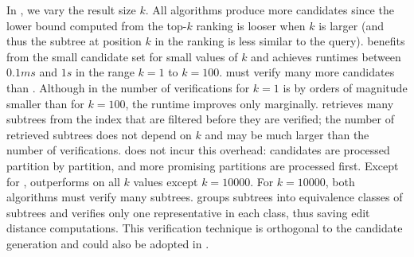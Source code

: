 In , we vary the result size $k$. All algorithms produce more candidates since the lower bound computed from the top-$k$ ranking is looser when $k$ is larger (and thus the subtree at position $k$ in the ranking is less similar to the query).
%
\shinconeshort{} benefits from the small candidate set for small values of $k$ and achieves runtimes between $0.1ms$ and $1s$ in the range $k = 1$ to $k = 100$. \structuresearchshort{} must verify many more candidates than \shincone{}. Although in \structuresearchshort{} the number of verifications for $k = 1$ is by orders of magnitude smaller than for $k = 100$, the runtime improves only marginally. \structuresearchshort{} retrieves many subtrees from the index that are filtered before they are verified; the number of retrieved subtrees does not depend on $k$ and may be much larger than the number of verifications.  \shinconeshort{} does not incur this overhead: candidates are processed partition by partition, and more promising partitions are processed first.
%
Except for \dblp{}, \shinconeshort{} outperforms \structuresearchshort{} on all $k$ values except $k = 10000$. For $k = 10000$, both algorithms must verify many subtrees. \structuresearchshort{} groups subtrees into equivalence classes of subtrees and verifies only one representative in each class, thus saving edit distance computations. This verification technique is orthogonal to the candidate generation and could also be adopted in \shinconeshort{}.


